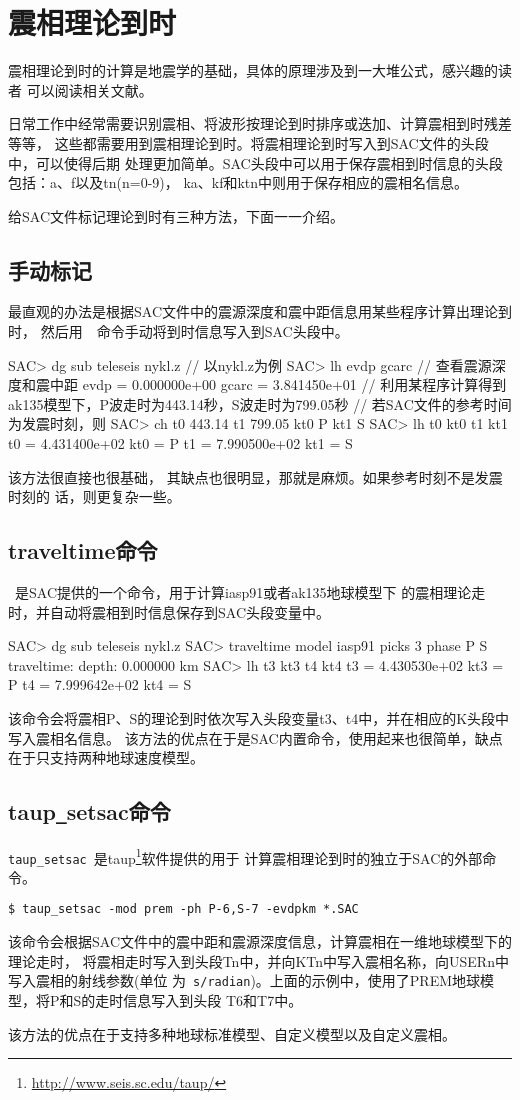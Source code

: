 \section{震相理论到时}
震相理论到时的计算是地震学的基础，具体的原理涉及到一大堆公式，感兴趣的读者
可以阅读相关文献。

日常工作中经常需要识别震相、将波形按理论到时排序或迭加、计算震相到时残差等等，
这些都需要用到震相理论到时。将震相理论到时写入到SAC文件的头段中，可以使得后期
处理更加简单。SAC头段中可以用于保存震相到时信息的头段包括：a、f以及tn(n=0-9)，
ka、kf和ktn中则用于保存相应的震相名信息。

给SAC文件标记理论到时有三种方法，下面一一介绍。

\subsection{手动标记}
最直观的办法是根据SAC文件中的震源深度和震中距信息用某些程序计算出理论到时，
然后用~~命令手动将到时信息写入到SAC头段中。
\begin{SACCode}
SAC> dg sub teleseis nykl.z     // 以nykl.z为例
SAC> lh evdp gcarc              // 查看震源深度和震中距
     evdp = 0.000000e+00
    gcarc = 3.841450e+01
// 利用某程序计算得到ak135模型下，P波走时为443.14秒，S波走时为799.05秒
// 若SAC文件的参考时间为发震时刻，则
SAC> ch t0 443.14 t1 799.05 kt0 P kt1 S
SAC> lh t0 kt0 t1 kt1
     t0 = 4.431400e+02
    kt0 = P
     t1 = 7.990500e+02
    kt1 = S
\end{SACCode}
该方法很直接也很基础， 其缺点也很明显，那就是麻烦。如果参考时刻不是发震时刻的
话，则更复杂一些。

\subsection{traveltime命令}
~是SAC提供的一个命令，用于计算iasp91或者ak135地球模型下
的震相理论走时，并自动将震相到时信息保存到SAC头段变量中。
\begin{SACCode}
SAC> dg sub teleseis nykl.z
SAC> traveltime model iasp91 picks 3 phase P S
traveltime: depth: 0.000000 km
SAC> lh t3 kt3 t4 kt4
         t3 = 4.430530e+02
        kt3 = P
         t4 = 7.999642e+02
        kt4 = S
\end{SACCode}
该命令会将震相P、S的理论到时依次写入头段变量t3、t4中，并在相应的K头段中写入震相名信息。
该方法的优点在于是SAC内置命令，使用起来也很简单，缺点在于只支持两种地球速度模型。

\subsection{taup\texttt{\_}setsac命令}
\verb+taup_setsac+~是taup\footnote{\url{http://www.seis.sc.edu/taup/}}软件提供的用于
计算震相理论到时的独立于SAC的外部命令。
\begin{verbatim}
$ taup_setsac -mod prem -ph P-6,S-7 -evdpkm *.SAC
\end{verbatim}
该命令会根据SAC文件中的震中距和震源深度信息，计算震相在一维地球模型下的理论走时，
将震相走时写入到头段Tn中，并向KTn中写入震相名称，向USERn中写入震相的射线参数(单位
为~\verb+s/radian+)。上面的示例中，使用了PREM地球模型，将P和S的走时信息写入到头段
T6和T7中。

该方法的优点在于支持多种地球标准模型、自定义模型以及自定义震相。
